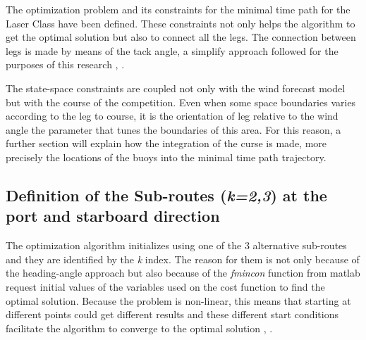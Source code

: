The optimization problem and its constraints for the minimal time path for the Laser Class have been defined. These constraints not only helps the algorithm to get the optimal solution but also to connect all the legs. The connection between legs is made by means of the tack angle, a simplify approach followed for the purposes of this research \cite{jouffroy2009steering}, \cite{LinXiao2011ModelingYachts}.\par 
The state-space constraints are coupled not only with the wind forecast model but with the course of the competition. Even when some space boundaries varies according to the leg to course, it is the orientation of leg relative to the wind angle the parameter that tunes the boundaries of this area. For this reason, a further section will explain how the integration of the curse is made, more precisely the locations of the buoys into the minimal time path trajectory.\par 

 \subsection{Definition of the Sub-routes (\textit{k=2,3}) at the port and starboard direction} \label{sec:sub_routes_DEF}

The optimization algorithm initializes using one of the 3 alternative sub-routes and they are identified by the \textit{k} index. %
The reason for them is not only because of the heading-angle approach but also because of the \textit{fmincon} function from \acrshort{matlab} request initial values of the variables used on the cost function to find the optimal solution. Because the problem is non-linear, this means that starting at different points could get different results and these different start conditions facilitate the algorithm to converge to the optimal solution %
\cite{mitchell2000geometric}, \cite{kelly2015transcription}. \par 

